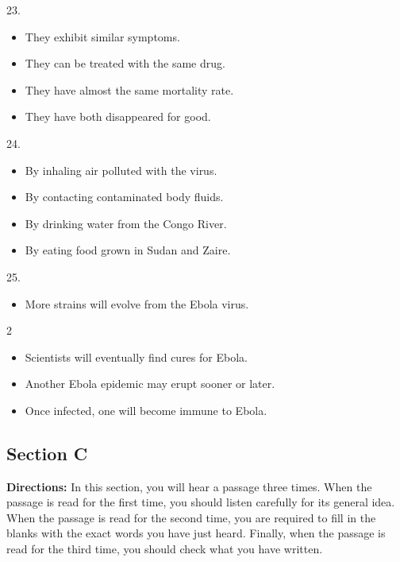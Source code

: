 \documentclass[UTF8,11pt]{ctexart}
\begin{document}
23.


\begin{itemize}[leftmargin=2em,itemsep=.2em,topsep=.4em]\item[A.] They exhibit similar symptoms.
\item[B.] They can be treated with the same drug.
\item[C.] They have almost the same mortality rate.
\item[D.] They have both disappeared for good.
\end{itemize}

24.


\begin{itemize}[leftmargin=2em,itemsep=.2em,topsep=.4em]\item[A.] By inhaling air polluted with the virus.
\item[B.] By contacting contaminated body fluids.
\item[C.] By drinking water from the Congo River.
\item[D.] By eating food grown in Sudan and Zaire.
\end{itemize}

25.


\begin{itemize}[leftmargin=2em,itemsep=.2em,topsep=.4em]\item[A.] More strains will evolve from the Ebola virus.
\end{itemize}

2


\begin{itemize}[leftmargin=2em,itemsep=.2em,topsep=.4em]\item[B.] Scientists will eventually find cures for Ebola.
\item[C.] Another Ebola epidemic may erupt sooner or later.
\item[D.] Once infected, one will become immune to Ebola.
\end{itemize}

\subsection*{\textbf{Section C}}


\textbf{Directions:} In this section, you will hear a passage three times. When the passage is read for the first time, you should listen carefully for its general idea. When the passage is read for the second time, you are required to fill in the blanks with the exact words you have just heard. Finally, when the passage is read for the third time, you should check what you have written.
\end{document}
